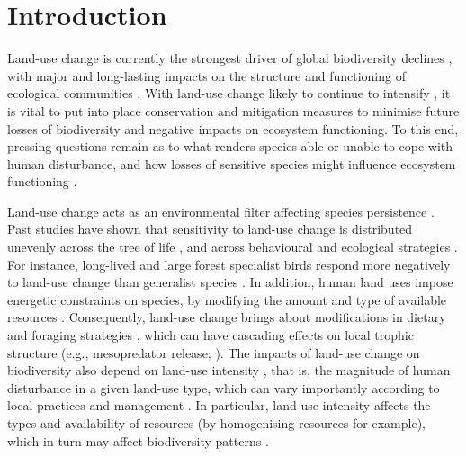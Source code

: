 \section{Introduction}
  
Land-use change is currently the strongest driver of global biodiversity declines \citep{Newbold2015, Maxwell2016}, with major and long-lasting impacts on the structure and functioning of ecological communities \citep{Bregman2016, Fukasawa2019, Magioli2021, Marcacci2021}. With land-use change likely to continue to intensify \citep{Stehfest2019}, it is vital to put into place conservation and mitigation measures to minimise future losses of biodiversity and negative impacts on ecosystem functioning. To this end, pressing questions remain as to what renders species able or unable to cope with human disturbance, and how losses of sensitive species might influence ecosystem functioning \citep{Dirzo2014, Young2016}.    

Land-use change acts as an environmental filter affecting species persistence \citep{Evans2018, Edwards2021}. Past studies have shown that sensitivity to land-use change is distributed unevenly across the tree of life \citep{Nowakowski2018a}, and across behavioural \citep{Lowry2013, Samia2015} and ecological strategies \citep{Newbold2013, Moller2009, DePalma2015}. For instance, long-lived and large forest specialist birds respond more negatively to land-use change than generalist species \citep{Newbold2013}. In addition, human land uses impose energetic constraints on species, by modifying the amount and type of available resources \citep{Inger2016, ZunigaPalacios2021}. Consequently, land-use change brings about modifications in dietary and foraging strategies \citep{Moller2009, Ramesh2017, Seveque2020}, which can have cascading effects on local trophic structure (e.g., mesopredator release; \citet{Crooks2010}). The impacts of land-use change on biodiversity also depend on land-use intensity \citep{Newbold2015, Davison2021}, that is, the magnitude of human disturbance in a given land-use type, which can vary importantly according to local practices and management \citep{Dullinger2021}. In particular, land-use intensity affects the types and availability of resources (by homogenising resources for example), which in turn may affect biodiversity patterns \citep{Weiner2011}.

